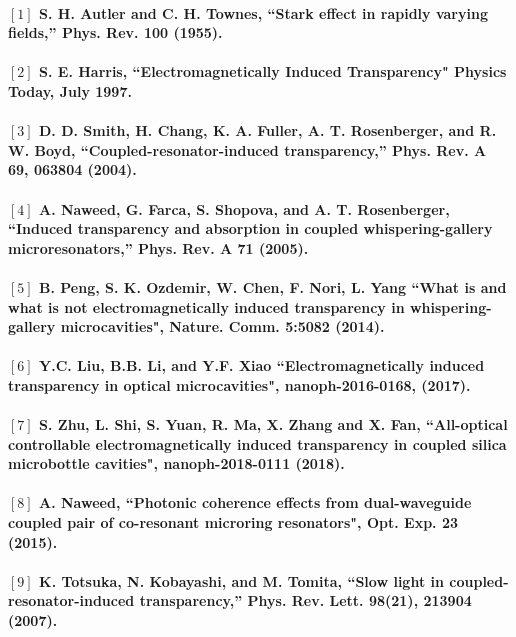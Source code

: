 \paragraph{\normalfont \large $[1]$ S. H. Autler and C. H. Townes, “Stark effect in rapidly varying fields,” Phys. Rev. \textbf{100} (1955). \\ 
\\$[2]$ S. E. Harris, “Electromagnetically Induced Transparency" Physics Today, July 1997. \\
\\$[3]$ D. D. Smith, H. Chang, K. A. Fuller, A. T. Rosenberger, and R. W. Boyd, “Coupled-resonator-induced transparency,” Phys. Rev. A \textbf{69}, 063804 (2004). \\
\\$[4]$  A. Naweed, G. Farca, S. Shopova, and A. T. Rosenberger, “Induced transparency and absorption in coupled
whispering-gallery microresonators,” Phys. Rev. A \textbf{71} (2005).\\
\\ $[5]$ B. Peng, S. K. Ozdemir, W. Chen, F. Nori, L. Yang “What is and what is not electromagnetically induced transparency in whispering-gallery microcavities", Nature. Comm. \textbf{5}:5082 (2014).\\
\\ $[6]$ Y.C. Liu, B.B. Li, and Y.F. Xiao “Electromagnetically induced transparency in optical microcavities", nanoph-2016-0168, (2017).\\
\\ $[7]$ S. Zhu, L. Shi, S. Yuan, R. Ma, X. Zhang and X. Fan, “All-optical controllable electromagnetically induced transparency in coupled silica microbottle cavities", nanoph-2018-0111 (2018).\\
\\ $[8]$ A. Naweed, “Photonic coherence effects from dual-waveguide coupled pair of co-resonant microring resonators", Opt. Exp. \textbf{23} (2015).\\
\\ $[9]$ K. Totsuka, N. Kobayashi, and M. Tomita, “Slow light in coupled-resonator-induced transparency,” Phys. Rev.
Lett. \textbf{98}(21), 213904 (2007).}